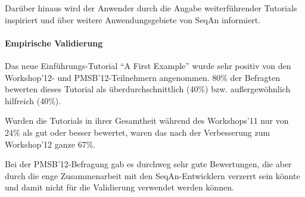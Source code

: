Darüber hinaus wird der Anwender durch die Angabe weiterführender Tutorials inspiriert und über weitere Anwendungsgebiete von SeqAn informiert.


\paragraph{Empirische Validierung}

Das neue Einführungs-Tutorial ``A First Example'' wurde sehr positiv von den Workshop'12- und PMSB'12-Teilnehmern angenommen.  80\% der Befragten bewerten dieses Tutorial als überdurchschnittlich (40\%) bzw. außergewöhnlich hilfreich (40\%).

Wurden die Tutorials in ihrer Gesamtheit während des Workshops'11 nur von 24\% als gut oder besser bewertet, waren das nach der Verbesserung zum Workshop'12 ganze 67\%.

Bei der PMSB'12-Befragung gab es durchweg sehr gute Bewertungen, die aber durch die enge Zusammenarbeit mit den SeqAn-Entwicklern verzerrt sein könnte und damit nicht für die Validierung verwendet werden können.